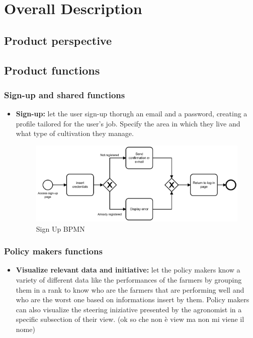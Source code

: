 \documentclass[table, 12pt]{article}
\begin{document}
\section{Overall Description}
\subsection{Product perspective}
\subsection{Product functions}
\subsubsection{Sign-up and shared functions}
\begin{itemize}
    \item \textbf{Sign-up:} let the user sign-up thorugh an email and a password, creating a profile tailored for the user's job. Specify the area in which they live and what type of cultivation they manage.
    \begin{center}
        \begin{figure}[!h]
            \includegraphics[width=\textwidth]{assets/BPMN/SignUpBpmn}
            \caption{Sign Up BPMN}
            \label{fig: singup}
        \end{figure}
    \end{center}
\end{itemize}
\subsubsection{Policy makers functions}
\begin{itemize}                                 
    \item \textbf{Visualize relevant data and initiative: }let the policy makers know a variety of different data like the performances of the farmers by grouping them in a rank to know who are the farmers that are performing well and who are the worst one based on informations insert by them.
    Policy makers can also visualize the steering iniziative presented by the agronomist in a specific subsection of their view. (ok so che non è view ma non mi viene il nome)
\end{itemize}
\end{document}
